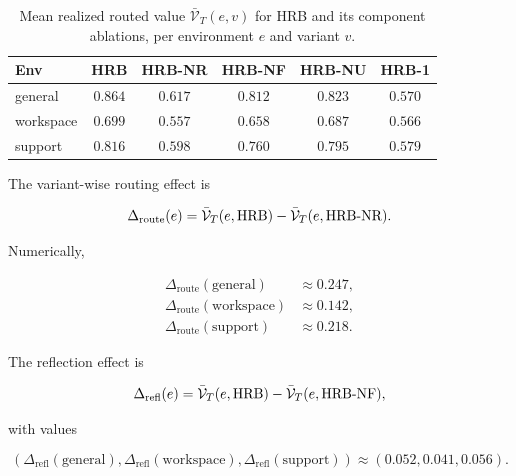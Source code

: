 \documentclass{article} %
\begin{document}
\begin{table}[h]
\centering
\small
\caption{Mean realized routed value $\bar{\mathcal{V}}_T(e,v)$ for HRB and its component ablations, per environment $e$ and variant $v$.}
\label{tab:app-mean-reward-sweeps}
\begin{tabular}{lccccc}
\toprule
Env & HRB & HRB-NR & HRB-NF & HRB-NU & HRB-1 \\
\midrule
general    & $0.864$ & $0.617$ & $0.812$ & $0.823$ & $0.570$ \\
workspace  & $0.699$ & $0.557$ & $0.658$ & $0.687$ & $0.566$ \\
support    & $0.816$ & $0.598$ & $0.760$ & $0.795$ & $0.579$ \\
\bottomrule
\end{tabular}

\end{table}

The variant-wise routing effect is

\begin{equation}
\label{eq:app-routing-effect}
\Delta_{\mathrm{route}}(e) = \bar{\mathcal{V}}_T(e,\mathrm{HRB}) - \bar{\mathcal{V}}_T(e,\textnormal{HRB-NR}).
\end{equation}

Numerically,

\begin{equation}
\label{eq:app-routing-numbers}
\begin{aligned}
\Delta_{\mathrm{route}}(\mathrm{general}) &\approx 0.247,\\
\Delta_{\mathrm{route}}(\mathrm{workspace}) &\approx 0.142,\\
\Delta_{\mathrm{route}}(\mathrm{support}) &\approx 0.218.
\end{aligned}
\end{equation}

The reflection effect is

\begin{equation}
\label{eq:app-reflection-effect}
\Delta_{\mathrm{refl}}(e) = \bar{\mathcal{V}}_T(e,\mathrm{HRB}) - \bar{\mathcal{V}}_T(e,\textnormal{HRB-NF}),
\end{equation}

with values

\begin{equation}
\label{eq:app-reflection-numbers}
(\Delta_{\mathrm{refl}}(\mathrm{general}),\Delta_{\mathrm{refl}}(\mathrm{workspace}),\Delta_{\mathrm{refl}}(\mathrm{support}))
\approx (0.052, 0.041, 0.056).
\end{equation}
\end{document}
